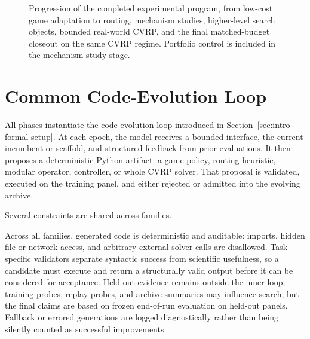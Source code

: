 \begin{figure}[t]
\centering
{}
\caption[Progression of the experimental program]{Progression of the completed experimental program, from low-cost game adaptation to
routing, mechanism studies, higher-level search objects, bounded real-world CVRP, and the final
matched-budget closeout on the same CVRP regime. Portfolio control is included in the
mechanism-study stage.}
\label{fig:methods-progression}
\end{figure}

\section{Common Code-Evolution Loop}
\label{sec:methods-loop}

All phases instantiate the code-evolution loop introduced in
Section~\ref{sec:intro-formal-setup}. At each epoch, the model receives a bounded interface, the
current incumbent or scaffold, and structured feedback from prior evaluations. It then proposes a
deterministic Python artifact: a game policy, routing heuristic, modular operator, controller, or
whole CVRP solver. That proposal is validated, executed on the training panel, and either rejected
or admitted into the evolving archive.

Several constraints are shared across families.

Across all families, generated code is deterministic and auditable: imports, hidden file or
network access, and arbitrary external solver calls are disallowed. Task-specific validators
separate syntactic success from scientific usefulness, so a candidate must execute and return a
structurally valid output before it can be considered for acceptance. Held-out evidence remains
outside the inner loop; training probes, replay probes, and archive summaries may influence
search, but the final claims are based on frozen end-of-run evaluation on held-out panels.
Fallback or errored generations are logged diagnostically rather than being silently counted as
successful improvements.

